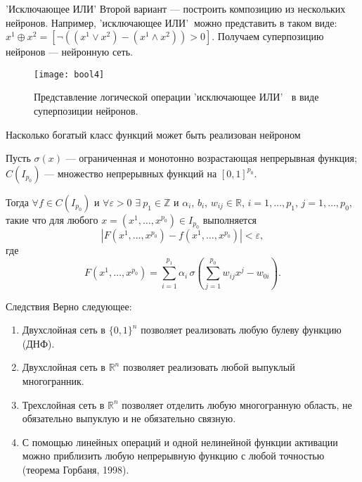 \documentclass[11pt]{beamer}
\begin{document}
	\begin{frame}{'Исключающее ИЛИ'}
		Второй вариант --- построить композицию из нескольких нейронов. Например, 'исключающее ИЛИ'$~$ можно представить в таком виде: $x^1 \oplus x^2 = [\lnot((x^1\lor x^2) - (x^1 \wedge x^2))>0]$. Получаем суперпозицию нейронов --- нейронную сеть.
		
		\begin{figure}[H]
			\begin{center}
					\texttt{[image: bool4]}
					\caption{Представление логической операции 'исключающее ИЛИ' $~$ в виде суперпозиции нейронов.}
					\label{bool4}
			\end{center}
		\end{figure}
	\end{frame}

	\begin{frame}{Насколько богатый класс функций может быть реализован нейроном}
		\begin{theorem}[Цыбенко, 1989]
			Пусть $\sigma(x)$ --- ограниченная и монотонно возрастающая непрерывная функция; $C(I_{p_0})$ --- множество непрерывных функций на $[0,1]^{p_0}$.
			
			Тогда $\forall f \in C(I_{p_0})$ и $\forall \varepsilon > 0$  $\exists ~p_1 \in \mathbb{Z}$ и  $\alpha_i$, $b_i$, $w_{ij} \in \mathbb{R}$, $i=1,\ldots,p_1$, $j=1,\ldots, p_0$, такие что для любого $x=(x^1, \ldots, x^{p_0}) \in I_{p_0}$ выполняется
			\begin{equation*}
				| F(x^1, \ldots, x^{p_0}) - f(x^1, \ldots, x^{p_0})| < \varepsilon,
			\end{equation*}
			где  \begin{equation*}
				F(x^1, \ldots, x^{p_0})=\sum_{i=1}^{p_1} \alpha_i \, \sigma \left(\sum_{j=1}^{p_0} w_{ij} x^j -w_{0i}   \right).
			\end{equation*}
		\end{theorem}	
	\end{frame}

	\begin{frame}{Следствия}
			Верно следующее:
		\begin{enumerate} 
			\item Двухслойная сеть в $\{0,1\}^n$ позволяет реализовать любую булеву функцию (ДНФ). 
			\item Двухслойная сеть в $\mathbb{R}^n$ позволяет реализовать любой выпуклый многогранник. 
			\item Трехслойная сеть в $\mathbb{R}^n$ позволяет отделить любую многогранную область, не обязательно выпуклую и не обязательно связную. 
			\item С помощью линейных операций и одной нелинейной функции активации можно приблизить любую непрерывную функцию с любой точностью (теорема Горбаня, 1998). 
		\end{enumerate}
	\end{frame}
\end{document}
